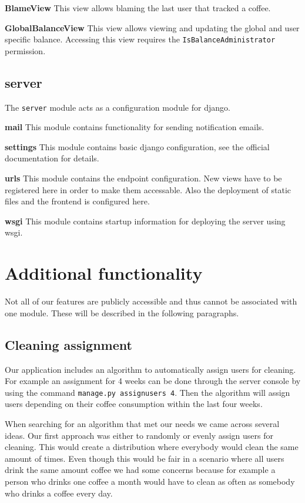 \textbf{BlameView} This view allows blaming the last user that tracked a
coffee.

\textbf{GlobalBalanceView} This view allows viewing and updating the
global and user specific balance. Accessing this view requires the
\texttt{IsBalanceAdministrator} permission.

\subsection{server}\label{server}

The \texttt{server} module acts as a configuration module for django.

\textbf{mail} This module contains functionality for sending
notification emails.

\textbf{settings} This module contains basic django configuration, see
the official documentation for details.

\textbf{urls} This module contains the endpoint configuration. New views
have to be registered here in order to make them accessable. Also the
deployment of static files and the frontend is configured here.

\textbf{wsgi} This module contains startup information for deploying the
server using wsgi.

\newpage
\section{Additional functionality}\label{additional-functionality}

Not all of our features are publicly accessible and thus cannot be
associated with one module. These will be described in the following
paragraphs.

\subsection{Cleaning assignment}\label{cleaning-assignment}

Our application includes an algorithm to automatically assign users for
cleaning. For example an assignment for 4 weeks can be done through the
server console by using the command \texttt{manage.py\ assignusers\ 4}.
Then the algorithm will assign users depending on their coffee
consumption within the last four weeks.

When searching for an algorithm that met our needs we came across
several ideas. Our first approach was either to randomly or evenly
assign users for cleaning. This would create a distribution where
everybody would clean the same amount of times. Even though this would
be fair in a scenario where all users drink the same amount coffee we
had some concerns because for example a person who drinks one coffee a
month would have to clean as often as somebody who drinks a coffee every
day.

